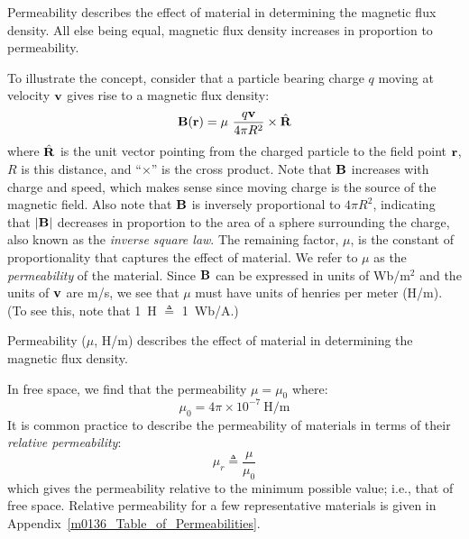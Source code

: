 

\label{m0009_Permeability} %

Permeability describes the effect of material in determining the magnetic flux density.  
All else being equal, magnetic flux density increases in proportion to permeability.
 
To illustrate the concept, consider that a particle bearing charge $q$ moving at velocity ${\bf v}$ gives rise to a magnetic flux density:
%
\begin{equation}
{\bf B}({\bf r}) = \mu ~ \frac{q {\bf v}}{4\pi R^2} \times \hat{\bf R}
\end{equation}
%
where $\hat{\bf R}$ is the unit vector pointing from the charged particle to the field point ${\bf r}$, $R$ is this distance, and ``$\times$'' is the cross product.
Note that ${\bf B}$ increases with charge and speed, which makes sense since moving charge is the source of the magnetic field.  
Also note that ${\bf B}$ is inversely proportional to $4\pi R^2$, indicating that $\left|{\bf B}\right|$ decreases in proportion to the area of a sphere surrounding the charge, also known as the {\it inverse square law}.
The remaining factor, $\mu$, is the constant of proportionality that captures the effect of material.
We refer to $\mu$ as the \emph{permeability} of the material.
Since ${\bf B}$ can be expressed in units of Wb/m$^2$ and the units of ${\bf v}$ are m/s, we see that $\mu$ must have units of henries per meter (H/m). 
(To see this, note that 1~H $\triangleq$ 1~Wb/A.)   

\begin{mdframed}[backgroundcolor=yellow!20,nobreak=true] 
Permeability ($\mu$, H/m) describes the effect of material in determining the magnetic flux density. 
\end{mdframed}

In free space, we find that the permeability $\mu=\mu_0$ where:
%
\begin{equation}
\mu_0 = 4\pi \times 10^{-7} ~\mbox{H/m}
\end{equation}
% 
It is common practice to describe the permeability of materials in terms of their {\it relative permeability}:
%
\begin{equation}
\mu_r \triangleq \frac{\mu}{\mu_0}
\end{equation}
%
which gives the permeability relative to the minimum possible value; i.e., that of free space.  Relative permeability for a few representative materials is given in Appendix~\ref{m0136_Table_of_Permeabilities}.  


